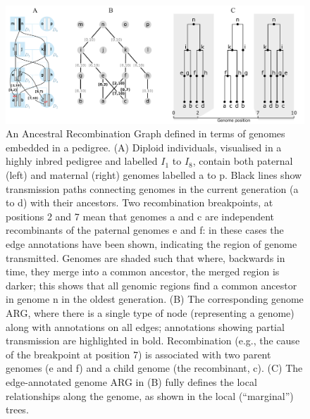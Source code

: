 \documentclass{article}
\begin{document}
\begin{figure}
\begin{center}
    \includegraphics[width=\textwidth]{illustrations/arg-in-pedigree}
\end{center}
\caption{\label{fig-arg-in-pedigree}
An Ancestral Recombination Graph defined in terms of genomes embedded
in a pedigree. (A) Diploid individuals, visualised in a highly inbred pedigree and
labelled $I_1$ to $I_8$, contain both paternal (left) and maternal (right) genomes
labelled \textsf{a} to \textsf{p}. Black lines show transmission paths connecting
genomes in the current generation (\textsf{a} to \textsf{d}) with their ancestors.
Two recombination breakpoints, at positions 2 and 7 mean that genomes \textsf{a}
and \textsf{c} are independent recombinants of the paternal genomes \textsf{e}
and \textsf{f}: in these cases the edge annotations have been shown, indicating the
region of genome transmitted. Genomes are shaded such that where, backwards in time,
they merge into a common ancestor, the merged region is darker; this shows that all
genomic regions find a common ancestor in genome \textsf{n} in the oldest generation.
(B) The corresponding genome ARG, where there is a single type of node (representing
a genome) along with annotations on all edges; annotations showing partial
transmission are highlighted in bold. Recombination (e.g.,
the cause of the breakpoint at position 7)
is associated with two parent genomes (\textsf{e} and
\textsf{f}) and a child genome (the recombinant, \textsf{c}).
(C) The edge-annotated genome ARG in (B) fully defines the
local relationships along the genome, as shown in the local
(``marginal'') trees.
}
\end{figure}
\end{document}
